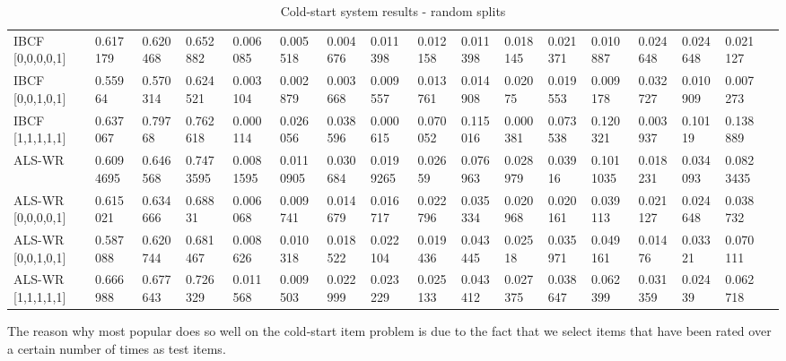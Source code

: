 \begin{table}[H]
{\begin{tabular}{*{17}{l}}
																														
IBCF [0,0,0,0,1] &	0.617179	&	0.620468	&	0.652882	&	0.006085	&	0.005518	&	0.004676	&	0.011398	&	0.012158	&	0.011398	&	0.018145	&	0.021371	&	0.010887	&	0.024648	&	0.024648	&	0.021127	& \\
IBCF [0,0,1,0,1] &	0.55964	&	0.570314	&	0.624521	&	0.003104	&	0.002879	&	0.003668	&	0.009557	&	0.013761	&	0.014908	&	0.02075	&	0.019553	&	0.009178	&	0.032727	&	0.010909	&	0.007273 & \\
IBCF [1,1,1,1,1]	& 0.637067	&	0.79768	&	0.762618	&	0.000114	&	0.026056	&	0.038596	&	0.000615	&	0.070052	&	0.115016	&	0.000381	&	0.073538	&	0.120321	&	0.003937	&	0.10119	&	0.138889	& \\
\rowcolor{Gray}
ALS-WR & 	0.6094695	&	0.646568	&	0.7473595	&	0.0081595	&	0.0110905	&	0.030684	&	0.0199265	&	0.02659	&	0.076963	&	0.028979	&	0.03916	&	0.1011035	&	0.018231	&	0.034093	&	0.0823435	 & \\
ALS-WR [0,0,0,0,1] & 	0.615021	&	0.634666	&	0.68831	&	0.006068	&	0.009741	&	0.014679	&	0.016717	&	0.022796	&	0.035334	&	0.020968	&	0.020161	&	0.039113	&	0.021127	&	0.024648	&	0.038732	& \\
ALS-WR [0,0,1,0,1] & 	0.587088	&	0.620744	&	0.681467	&	0.008626	&	0.010318	&	0.018522	&	0.022104	&	0.019436	&	0.043445	&	0.02518	&	0.035971	&	0.049161	&	0.01476	&	0.03321	&	0.070111 & \\																																																							
ALS-WR [1,1,1,1,1] &	0.666988	&	0.677643	&	0.726329	&	0.011568	&	0.009503	&	0.022999	&	0.023229	&	0.025133	&	0.043412	&	0.027375	&	0.038647	&	0.062399	&	0.031359	&	0.02439	&	0.062718	& \\

\bottomrule
\end{tabular}
}
\caption{Cold-start system results - random splits}
\end{table}













The reason why most popular does so well on the cold-start item problem is due to the fact that we select items that have been rated over a certain number of times as test items.

















